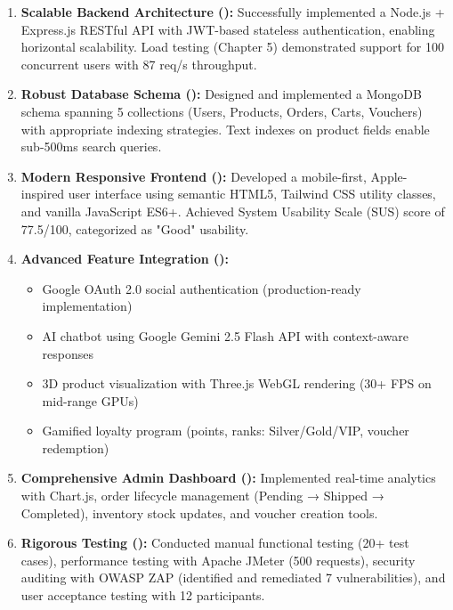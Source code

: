 \begin{enumerate}
    \item \textbf{Scalable Backend Architecture (\checkmark):} Successfully implemented a Node.js + Express.js RESTful API with JWT-based stateless authentication, enabling horizontal scalability. Load testing (Chapter 5) demonstrated support for 100 concurrent users with 87 req/s throughput.
    
    \item \textbf{Robust Database Schema (\checkmark):} Designed and implemented a MongoDB schema spanning 5 collections (Users, Products, Orders, Carts, Vouchers) with appropriate indexing strategies. Text indexes on product fields enable sub-500ms search queries.
    
    \item \textbf{Modern Responsive Frontend (\checkmark):} Developed a mobile-first, Apple-inspired user interface using semantic HTML5, Tailwind CSS utility classes, and vanilla JavaScript ES6+. Achieved System Usability Scale (SUS) score of 77.5/100, categorized as "Good" usability.
    
    \item \textbf{Advanced Feature Integration (\checkmark):} 
    \begin{itemize}
        \item Google OAuth 2.0 social authentication (production-ready implementation)
        \item AI chatbot using Google Gemini 2.5 Flash API with context-aware responses
        \item 3D product visualization with Three.js WebGL rendering (30+ FPS on mid-range GPUs)
        \item Gamified loyalty program (points, ranks: Silver/Gold/VIP, voucher redemption)
    \end{itemize}
    
    \item \textbf{Comprehensive Admin Dashboard (\checkmark):} Implemented real-time analytics with Chart.js, order lifecycle management (Pending → Shipped → Completed), inventory stock updates, and voucher creation tools.
    
    \item \textbf{Rigorous Testing (\checkmark):} Conducted manual functional testing (20+ test cases), performance testing with Apache JMeter (500 requests), security auditing with OWASP ZAP (identified and remediated 7 vulnerabilities), and user acceptance testing with 12 participants.
\end{enumerate}

